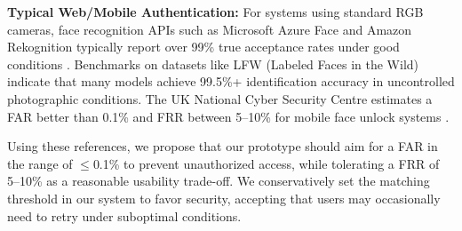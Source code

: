 \textbf{Typical Web/Mobile Authentication:} For systems using standard RGB cameras, face recognition APIs such as Microsoft Azure Face and Amazon Rekognition typically report over 99\% true acceptance rates under good conditions \autocite{IJCAFace}. Benchmarks on datasets like LFW (Labeled Faces in the Wild) indicate that many models achieve 99.5\%+ identification accuracy in uncontrolled photographic conditions. The UK National Cyber Security Centre estimates a FAR better than 0.1\% and FRR between 5--10\% for mobile face unlock systems \autocite{BentoFaceID,MicrosoftHelloDocs}.

Using these references, we propose that our prototype should aim for a FAR in the range of $\leq$0.1\% to prevent unauthorized access, while tolerating a FRR of 5--10\% as a reasonable usability trade-off. We conservatively set the matching threshold in our system to favor security, accepting that users may occasionally need to retry under suboptimal conditions.







